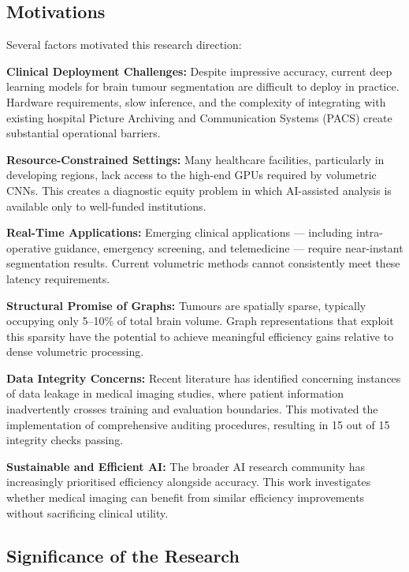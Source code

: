  
\subsection{Motivations}

Several factors motivated this research direction:

\textbf{Clinical Deployment Challenges:} Despite impressive accuracy, current deep learning models for brain tumour segmentation are difficult to deploy in practice. Hardware requirements, slow inference, and the complexity of integrating with existing hospital Picture Archiving and Communication Systems (PACS) create substantial operational barriers.

\textbf{Resource-Constrained Settings:} Many healthcare facilities, particularly in developing regions, lack access to the high-end GPUs required by volumetric CNNs. This creates a diagnostic equity problem in which AI-assisted analysis is available only to well-funded institutions.

\textbf{Real-Time Applications:} Emerging clinical applications — including intra-operative guidance, emergency screening, and telemedicine — require near-instant segmentation results. Current volumetric methods cannot consistently meet these latency requirements.

\textbf{Structural Promise of Graphs:} Tumours are spatially sparse, typically occupying only 5--10\% of total brain volume. Graph representations that exploit this sparsity have the potential to achieve meaningful efficiency gains relative to dense volumetric processing.

\textbf{Data Integrity Concerns:} Recent literature has identified concerning instances of data leakage in medical imaging studies, where patient information inadvertently crosses training and evaluation boundaries. This motivated the implementation of comprehensive auditing procedures, resulting in 15 out of 15 integrity checks passing.

\textbf{Sustainable and Efficient AI:} The broader AI research community has increasingly prioritised efficiency alongside accuracy. This work investigates whether medical imaging can benefit from similar efficiency improvements without sacrificing clinical utility.


\subsection{Significance of the Research}

